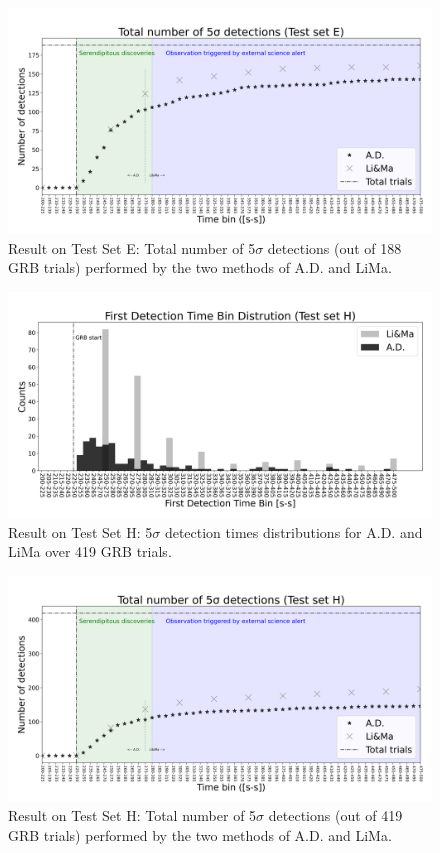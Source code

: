 \begin{figure}[t]
\centering
\includegraphics[width=1\textwidth]{figures/experiments/ad_vs_li_cumulative_testset_e_id_1.png}
\caption{Result on Test Set E: Total number of 5$\sigma$ detections (out of 188 GRB trials) performed by the two methods of A.D. and LiMa.}
\label{f:ad-vs-lima}
\end{figure}

\begin{figure}[t]
\centering
\includegraphics[width=1\textwidth]{figures/experiments/ad_vs_li_ma_first_detections_testset_h_id_1.png}
\caption{Result on Test Set H: 5$\sigma$ detection times distributions for A.D. and LiMa over 419 GRB trials.}
\label{f:ad-vs-lima-first-detection}
\end{figure}


\begin{figure}[t]
\centering
\includegraphics[width=1\textwidth]{figures/experiments/ad_vs_li_cumulative_testset_h_id_1.png}
\caption{Result on Test Set H: Total number of 5$\sigma$ detections (out of 419 GRB trials) performed by the two methods of A.D. and LiMa.}
\label{f:ad-vs-lima}
\end{figure}


